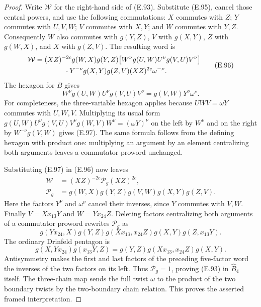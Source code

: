 \begin{proof}
Write $\mathcal W$ for the right-hand side of
(E.93).  Substitute (E.95), cancel those central
powers, and use the following commutations:
$X$ commutes with $Z$; $Y$ commutes with $U,V,W$;
$V$ commutes with $X,Y$; and $W$ commutes with
$Y,Z$.  Consequently $W$ also commutes with
$g(Y,Z)$, $V$ with $g(X,Y)$, $Z$ with $g(W,X)$,
and $X$ with $g(Z,V)$.
The resulting word is
\[
\begin{split}
\mathcal W={}&(XZ)^{-2c}g(W,X)g(Y,Z)
  \bigl[W^\nu g(U,W)U^\nu g(V,U)V^\nu\bigr]\\
 &\hspace{10mm}\cdot Y^{-\nu}g(X,Y)g(Z,V)
   (XZ)^{2c}\omega^{-\nu}.                            
\end{split}\tag{E.96}
\]
The hexagon for $B$ gives
\[
 W^\nu g(U,W)U^\nu g(V,U)V^\nu
                   =g(V,W)Y^\nu\omega^\nu.            \tag{E.97}
\]
For completeness, the three-variable hexagon
applies because $UWV=\omega Y$ commutes with
$U,W,V$.  Multiplying its usual form
$g(U,W)U^\nu g(V,U)V^\nu g(W,V)W^\nu
=(\omega Y)^\nu$ on the left by $W^\nu$ and
on the right by $W^{-\nu}g(V,W)$ gives (E.97).
The same formula follows from the defining
hexagon with product one: multiplying an
argument by an element centralizing both
arguments leaves a commutator proword
unchanged.

Substituting (E.97) in (E.96) now leaves
\[
\begin{split}
 \mathcal W&=(XZ)^{-2c}\mathcal P_g(XZ)^{2c},\\
 \mathcal P_g&=g(W,X)g(Y,Z)g(V,W)g(X,Y)g(Z,V).
\end{split}\tag{E.98}
\]
Here the factors $Y^\nu$ and $\omega^\nu$
cancel their inverses, since $Y$ commutes
with $V,W$.
Finally
$V=Xx_{13}Y$ and $W=Yx_{24}Z$.
Deleting factors centralizing both arguments
of a commutator proword rewrites $\mathcal P_g$ as
\[
 g(Yx_{24},X)g(Y,Z)
 g(Xx_{13},x_{24}Z)g(X,Y)g(Z,x_{13}Y).
\]
The ordinary Drinfeld pentagon is
\[
 g(X,Yx_{24})g(x_{13}Y,Z)
   =g(Y,Z)g(Xx_{13},x_{24}Z)g(X,Y).
\]
Antisymmetry makes the first and last factors
of the preceding five-factor word the inverses
of the two factors on its left.  Thus
$\mathcal P_g=1$, proving (E.93) in
$\widehat B_4$ itself.
The three-chain map sends the full twist
$\omega$ to the product of the two boundary
twists by the two-boundary chain relation.
This proves the asserted framed interpretation.
\end{proof}

